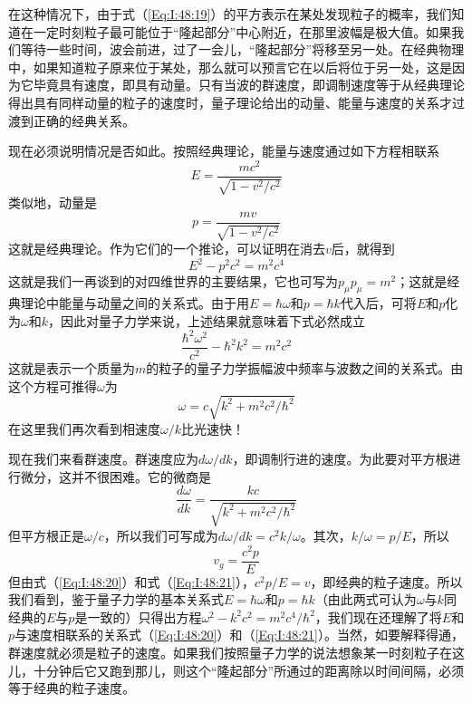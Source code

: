 在这种情况下，由于式（\ref{Eq:I:48:19}）的平方表示在某处发现粒子的概率，我们知道在一定时刻粒子最可能位于“隆起部分”中心附近，在那里波幅是极大值。如果我们等待一些时间，波会前进，过了一会儿，“隆起部分”将移至另一处。在经典物理中，如果知道粒子原来位于某处，那么就可以预言它在以后将位于另一处，这是因为它毕竟具有速度，即具有动量。只有当波的群速度，即调制速度等于从经典理论得出具有同样动量的粒子的速度时，量子理论给出的动量、能量与速度的关系才过渡到正确的经典关系。

现在必须说明情况是否如此。按照经典理论，能量与速度通过如下方程相联系
\begin{equation}
    \label{Eq:I:48:20}
    E = \frac{mc^2}{\sqrt{1-v^2/c^2}}
\end{equation}
类似地，动量是
\begin{equation}
    \label{Eq:I:48:21}
    p = \frac{mv}{\sqrt{1-v^2/c^2}}
\end{equation}
这就是经典理论。作为它们的一个推论，可以证明在消去$v$后，就得到
\begin{equation*}
    E^2 - p^2c^2 = m^2c^4
\end{equation*}
这就是我们一再谈到的对四维世界的主要结果，它也可写为$p_\mu p_\mu =m^2$；这就是经典理论中能量与动量之间的关系式。由于用$E=\hbar\omega$和$p=\hbar k$代入后，可将$E$和$p$化为$\omega$和$k$，因此对量子力学来说，上述结果就意味着下式必然成立
\begin{equation}
    \label{Eq:I:48:22}
    \frac{\hbar^2\omega^2}{c^2} - \hbar^2 k^2 = m^2c^2
\end{equation}
这就是表示一个质量为$m$的粒子的量子力学振幅波中频率与波数之间的关系式。由这个方程可推得$\omega$为
\begin{equation*}
    \omega = c\sqrt{k^2 + m^2c^2/\hbar^2}
\end{equation*}
在这里我们再次看到相速度$\omega /k$比光速快！

现在我们来看群速度。群速度应为$d\omega /dk$，即调制行进的速度。为此要对平方根进行微分，这并不很困难。它的微商是
\begin{equation*}
    \frac{d\omega}{dk} = \frac{kc}{\sqrt{k^2 + m^2c^2/\hbar^2}}
\end{equation*}
但平方根正是$\omega/c$，所以我们可写成为$d\omega/dk =c^2 k /\omega$。其次，$k /\omega =p /E$，所以
\begin{equation*}
    v_g = \frac{c^2p}{E}
\end{equation*}
但由式（\ref{Eq:I:48:20}）和式（\ref{Eq:I:48:21}），$c^2 p /E =v$，即经典的粒子速度。所以我们看到，鉴于量子力学的基本关系式$E=\hbar\omega$和$p=\hbar k$（由此两式可认为$\omega$与$k$同经典的$E$与$p$是一致的）只得出方程$\omega^2 - k^2c^2 = m^2c^4/\hbar^2$，我们现在还理解了将$E$和$p$与速度相联系的关系式（\ref{Eq:I:48:20}）和（\ref{Eq:I:48:21}）。当然，如要解释得通，群速度就必须是粒子的速度。如果我们按照量子力学的说法想象某一时刻粒子在这儿，十分钟后它又跑到那儿，则这个“隆起部分”所通过的距离除以时间间隔，必须等于经典的粒子速度。

